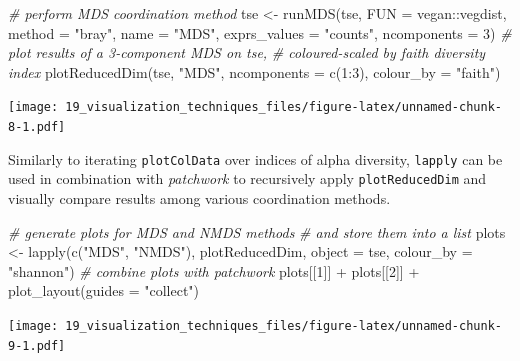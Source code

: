 \documentclass[
]{book}
\newenvironment{Shaded}{\begin{snugshade}}{\end{snugshade}}
\newcommand{\AttributeTok}[1]{\textcolor[rgb]{0.77,0.63,0.00}{#1}}
\newcommand{\CommentTok}[1]{\textcolor[rgb]{0.56,0.35,0.01}{\textit{#1}}}
\newcommand{\DecValTok}[1]{\textcolor[rgb]{0.00,0.00,0.81}{#1}}
\newcommand{\FunctionTok}[1]{\textcolor[rgb]{0.00,0.00,0.00}{#1}}
\newcommand{\NormalTok}[1]{#1}
\newcommand{\OtherTok}[1]{\textcolor[rgb]{0.56,0.35,0.01}{#1}}
\newcommand{\SpecialCharTok}[1]{\textcolor[rgb]{0.00,0.00,0.00}{#1}}
\newcommand{\StringTok}[1]{\textcolor[rgb]{0.31,0.60,0.02}{#1}}
\begin{document}
\begin{Shaded}
\begin{Highlighting}[]
\CommentTok{\# perform MDS coordination method}
\NormalTok{tse }\OtherTok{\textless{}{-}} \FunctionTok{runMDS}\NormalTok{(tse,}
              \AttributeTok{FUN =}\NormalTok{ vegan}\SpecialCharTok{::}\NormalTok{vegdist,}
              \AttributeTok{method =} \StringTok{"bray"}\NormalTok{,}
              \AttributeTok{name =} \StringTok{"MDS"}\NormalTok{,}
              \AttributeTok{exprs\_values =} \StringTok{"counts"}\NormalTok{,}
              \AttributeTok{ncomponents =} \DecValTok{3}\NormalTok{)}
\CommentTok{\# plot results of a 3{-}component MDS on tse,}
\CommentTok{\# coloured{-}scaled by faith diversity index}
\FunctionTok{plotReducedDim}\NormalTok{(tse, }\StringTok{"MDS"}\NormalTok{, }\AttributeTok{ncomponents =} \FunctionTok{c}\NormalTok{(}\DecValTok{1}\SpecialCharTok{:}\DecValTok{3}\NormalTok{), }\AttributeTok{colour\_by =} \StringTok{"faith"}\NormalTok{)}
\end{Highlighting}
\end{Shaded}

\texttt{[image: 19\_visualization\_techniques\_files/figure-latex/unnamed-chunk-8-1.pdf]}

Similarly to iterating \texttt{plotColData} over indices of alpha diversity, \texttt{lapply}
can be used in combination with \emph{patchwork} to recursively apply \texttt{plotReducedDim}
and visually compare results among various coordination methods.

\begin{Shaded}
\begin{Highlighting}[]
\CommentTok{\# generate plots for MDS and NMDS methods}
\CommentTok{\# and store them into a list}
\NormalTok{plots }\OtherTok{\textless{}{-}} \FunctionTok{lapply}\NormalTok{(}\FunctionTok{c}\NormalTok{(}\StringTok{"MDS"}\NormalTok{, }\StringTok{"NMDS"}\NormalTok{),}
\NormalTok{                plotReducedDim,}
                \AttributeTok{object =}\NormalTok{ tse,}
                \AttributeTok{colour\_by =} \StringTok{"shannon"}\NormalTok{)}
\CommentTok{\# combine plots with patchwork}
\NormalTok{plots[[}\DecValTok{1}\NormalTok{]] }\SpecialCharTok{+}\NormalTok{ plots[[}\DecValTok{2}\NormalTok{]] }\SpecialCharTok{+}
  \FunctionTok{plot\_layout}\NormalTok{(}\AttributeTok{guides =} \StringTok{"collect"}\NormalTok{)}
\end{Highlighting}
\end{Shaded}

\texttt{[image: 19\_visualization\_techniques\_files/figure-latex/unnamed-chunk-9-1.pdf]}
\end{document}
